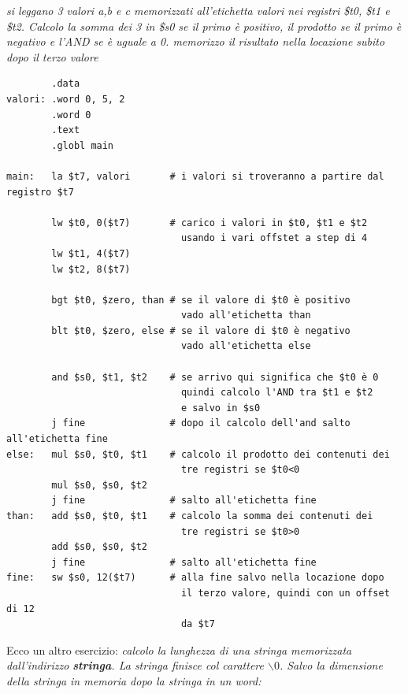 \documentclass[a4paper,12pt, oneside]{book}
\begin{document}
\textit{si leggano 3 valori a,b e c memorizzati all'etichetta valori nei registri \$t0, \$t1 e \$t2. Calcolo la somma dei 3 in \$s0 se il primo è positivo, il prodotto se il primo è negativo e l'AND se è uguale a 0. memorizzo il risultato nella locazione subito dopo il terzo valore}
\begin{verbatim}
        .data
valori: .word 0, 5, 2
        .word 0
        .text
        .globl main
        
main:   la $t7, valori       # i valori si troveranno a partire dal registro $t7

        lw $t0, 0($t7)       # carico i valori in $t0, $t1 e $t2
                               usando i vari offstet a step di 4
        lw $t1, 4($t7) 
        lw $t2, 8($t7)  
        
        bgt $t0, $zero, than # se il valore di $t0 è positivo
                               vado all'etichetta than
        blt $t0, $zero, else # se il valore di $t0 è negativo
                               vado all'etichetta else
        
        and $s0, $t1, $t2    # se arrivo qui significa che $t0 è 0
                               quindi calcolo l'AND tra $t1 e $t2
                               e salvo in $s0
        j fine               # dopo il calcolo dell'and salto all'etichetta fine
else:   mul $s0, $t0, $t1    # calcolo il prodotto dei contenuti dei
                               tre registri se $t0<0
        mul $s0, $s0, $t2
        j fine               # salto all'etichetta fine 
than:   add $s0, $t0, $t1    # calcolo la somma dei contenuti dei
                               tre registri se $t0>0
        add $s0, $s0, $t2
        j fine               # salto all'etichetta fine
fine:   sw $s0, 12($t7)      # alla fine salvo nella locazione dopo
                               il terzo valore, quindi con un offset di 12
                               da $t7 
\end{verbatim}
Ecco un altro esercizio:
\textit{calcolo la lunghezza di una stringa memorizzata dall'indirizzo \textbf{stringa}. La stringa finisce col carattere $\backslash 0$. Salvo la dimensione della stringa in memoria dopo la stringa in un word:}
\end{document}
